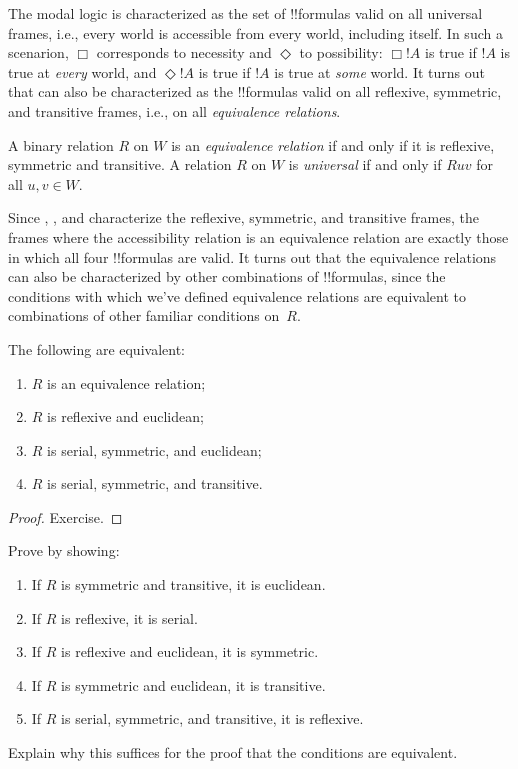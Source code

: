 \documentclass[../../../include/open-logic-section]{subfiles}
\begin{document}


The modal logic  is characterized as the set of !!{formula}s
valid on all universal frames, i.e., every world is accessible from
every world, including itself. In such a scenarion, $\Box$ corresponds
to necessity and $\Diamond$ to possibility: $\Box !A$ is true if $!A$
is true at \emph{every} world, and $\Diamond !A$ is true if $!A$ is
true at \emph{some} world. It turns out that  can also be
characterized as the !!{formula}s valid on all reflexive, symmetric,
and transitive frames, i.e., on all \emph{equivalence relations}.

\begin{defn}
  A binary relation $R$ on $W$ is an \emph{equivalence relation} if
  and only if it is reflexive, symmetric and transitive.  A relation
  $R$ on $W$ is \emph{universal} if and only if $Ruv$ for all $u,v \in
  W$.
\end{defn}

Since , , and  characterize the reflexive,
symmetric, and transitive frames, the frames where the accessibility
relation is an equivalence relation are exactly those in which all
four !!{formula}s are valid. It turns out that the equivalence
relations can also be characterized by other combinations of
!!{formula}s, since the conditions with which we've defined
equivalence relations are equivalent to combinations of other familiar
conditions on~$R$.

\begin{prop}
  The following are equivalent:
  \begin{enumerate}
  \item $R$ is an equivalence relation;
  \item $R$ is reflexive and euclidean;
  \item $R$ is serial, symmetric, and euclidean;
  \item $R$ is serial, symmetric, and transitive.
  \end{enumerate}
\end{prop}

\begin{proof}
  Exercise.
\end{proof}

\begin{prob}
  Prove  by showing:
  \begin{enumerate}
  \item If $R$ is symmetric and transitive, it is euclidean.
  \item If $R$ is reflexive, it is serial.
  \item If $R$ is reflexive and euclidean, it is symmetric.
  \item If $R$ is symmetric and euclidean, it is transitive.
  \item If $R$ is serial, symmetric, and transitive, it is reflexive.
  \end{enumerate}
  Explain why this suffices for the proof that the conditions are
  equivalent.
\end{prob}
\end{document}
